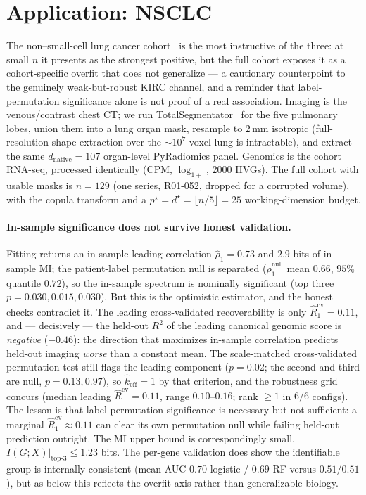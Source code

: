 \documentclass{article}
\begin{document}
\section{Application: NSCLC}
\label{sec:nsclc}

The non--small-cell lung cancer cohort~\citep{bakr2018nsclcradiogenomics} is
the most instructive of the three: at small $n$ it presents as the strongest
positive, but the full cohort exposes it as a cohort-specific overfit that does
not generalize --- a cautionary counterpoint to the genuinely weak-but-robust
KIRC channel, and a reminder that label-permutation significance alone is not
proof of a real association. Imaging is the venous/contrast chest CT; we run
TotalSegmentator~\citep{wasserthal2023totalsegmentator} for the five pulmonary
lobes, union them into a lung organ mask, resample to $2\,\mathrm{mm}$ isotropic
(full-resolution shape extraction over the $\sim$$10^{7}$-voxel lung is
intractable), and extract the same $d_{\mathrm{native}}=107$ organ-level
PyRadiomics panel. Genomics is the cohort RNA-seq, processed identically
(CPM, $\log_{1+}$, $2000$ HVGs). The full cohort with usable masks is
$n = 129$ (one series, R01-052, dropped for a corrupted volume), with the copula
transform and a $p^\star = d^\star = \lfloor n/5 \rfloor = 25$
working-dimension budget.

\paragraph{In-sample significance does not survive honest validation.}
Fitting returns an in-sample leading correlation $\hat\rho_1 = 0.73$ and
$2.9$ bits of in-sample MI; the patient-label permutation null is separated
($\hat\rho_1^{\mathrm{null}}$ mean $0.66$, $95\%$ quantile $0.72$), so the
in-sample spectrum is nominally significant (top three
$p = 0.030, 0.015, 0.030$). But this is the optimistic estimator, and the honest
checks contradict it. The leading cross-validated recoverability is only
$\hat R_1^{\mathrm{cv}} = 0.11$, and --- decisively --- the held-out $R^2$ of
the leading canonical genomic score is \emph{negative} ($-0.46$): the direction
that maximizes in-sample correlation predicts held-out imaging \emph{worse} than
a constant mean. The scale-matched cross-validated permutation test still flags
the leading component ($p = 0.02$; the second and third are null,
$p = 0.13, 0.97$), so $\hat k_{\mathrm{eff}} = 1$ by that criterion, and the
robustness grid concurs (median leading $\hat R^{\mathrm{cv}} = 0.11$, range
$0.10$--$0.16$; rank $\ge 1$ in $6/6$ configs). The lesson is that
label-permutation significance is necessary but not sufficient: a marginal
$\hat R_1^{\mathrm{cv}}\approx 0.11$ can clear its own permutation null while
failing held-out prediction outright. The MI upper bound is correspondingly
small, $I(G;X)\big|_{\text{top-}3} \le 1.23$ bits. The per-gene validation does
show the identifiable group is internally consistent (mean AUC $0.70$ logistic /
$0.69$ RF versus $0.51 / 0.51$), but as below this reflects the overfit axis
rather than generalizable biology.
\end{document}
